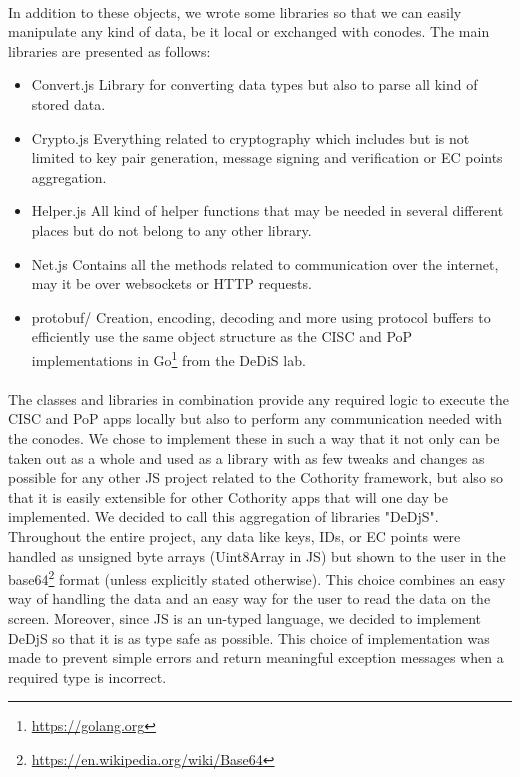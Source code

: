 \paragraph{}
In addition to these objects, we wrote some libraries so that we can easily manipulate any kind of data, be it local or exchanged with conodes. The main libraries are presented as follows:

\begin{itemize}
\item Convert.js \linebreak Library for converting data types but also to parse all kind of stored data.

\item Crypto.js \linebreak Everything related to cryptography which includes but is not limited to key pair generation, message signing and verification or EC points aggregation.

\item Helper.js \linebreak All kind of helper functions that may be needed in several different places but do not belong to any other library.

\item Net.js \linebreak Contains all the methods related to communication over the internet, may it be over websockets or HTTP requests.

\item protobuf/ \linebreak Creation, encoding, decoding and more using protocol buffers to efficiently use the same object structure as the CISC and PoP implementations in Go\footnote{\url{https://golang.org}} from the DeDiS lab.
\end{itemize}

\paragraph{}
The classes and libraries in combination provide any required logic to execute the CISC and PoP apps locally but also to perform any communication needed with the conodes. We chose to implement these in such a way that it not only can be taken out as a whole and used as a library with as few tweaks and changes as possible for any other JS project related to the Cothority framework, but also so that it is easily extensible for other Cothority apps that will one day be implemented. We decided to call this aggregation of libraries "DeDjS".
Throughout the entire project, any data like keys, IDs, or EC points were handled as unsigned byte arrays (Uint8Array in JS) but shown to the user in the base64\footnote{\url{https://en.wikipedia.org/wiki/Base64}} format (unless explicitly stated otherwise). This choice combines an easy way of handling the data and an easy way for the user to read the data on the screen. Moreover, since JS is an un-typed language, we decided to implement DeDjS so that it is as type safe as possible. This choice of implementation was made to prevent simple errors and return meaningful exception messages when a required type is incorrect.

